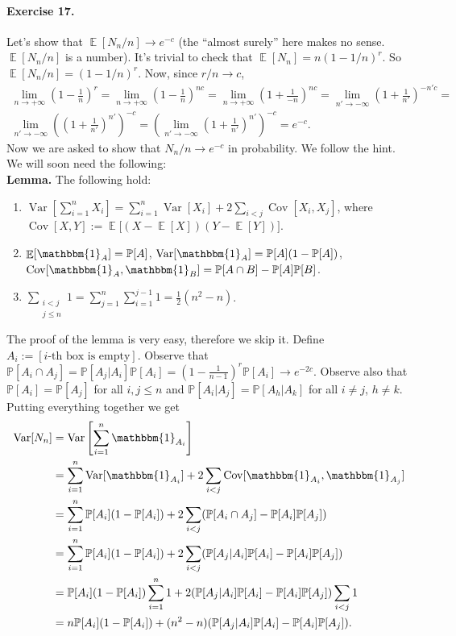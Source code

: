\documentclass[12pt,a4paper]{report}
\theoremstyle{definition}
\theoremstyle{num.custom-title}
\DeclareMathOperator{\E}{\mathbb{E}}
\DeclareMathOperator{\Var}{Var}
\DeclareMathOperator{\Cov}{Cov}
\renewcommand{\1}{\mathbbm{1}}
\renewcommand{\P}{\mathbb{P}}
\begin{document}
\paragraph{Exercise 17.} Let's show that $\E[N_n/n] \to e^{-c}$ (the ``almost surely'' here makes no sense. $\E[N_n/n]$ is a number). It's trivial to check that $\E[N_n]=n(1-1/n)^r$. So $\E[N_n/n]=(1-1/n)^r$. Now, since $r/n \to c$,
\begin{multline*}
	\lim_{n \to +\infty} \left( 1-\frac{1}{n} \right)^r = \lim_{n \to +\infty} \left( 1-\frac{1}{n} \right)^{nc} = \lim_{n \to +\infty} \left( 1+\frac{1}{-n} \right)^{nc} = \lim_{n' \to -\infty} \left( 1+\frac{1}{n'} \right)^{-n' c} = \\
	\lim_{n' \to -\infty} \left( \left( 1+\frac{1}{n'} \right)^{n'} \right) ^{-c} = \left( \lim_{n' \to -\infty}  \left( 1+\frac{1}{n'} \right)^{n'} \right) ^{-c} = e^{-c}.
\end{multline*}
Now we are asked to show that $N_n/n \to e^{-c}$ in probability. We follow the hint. We will soon need the following:\\
\textbf{Lemma.} The following hold:
\begin{enumerate}
	\item $\Var \left[ \sum_{i=1}^n X_i \right] = \sum_{i=1}^n \Var[X_i] + 2\sum_{i<j} \Cov[X_i,X_j]$, where \\
	$\Cov[X,Y] := \E{\big[(X - \E[X])(Y - \E[Y])\big]}$.
	\item $\E[\1_A] = \P[A]$, $\Var[\1_A] = \P[A](1-\P[A])$, $\Cov[\1_A,\1_B]= \P[A \cap B] - \P[A]\P[B]$.
	\item $\displaystyle \sum_{\substack{i<j \\ j \leq n}} 1 = \sum_{j=1}^n \sum_{i=1}^{j-1} 1 = \frac{1}{2} (n^2-n)$.
\end{enumerate}
The proof of the lemma is very easy, therefore we skip it. Define $A_i := [i\text{-th box is empty}]$. Observe that $\P[A_i \cap A_j] = \P[A_j | A_i] \P[A_i] = \left( 1 - \frac{1}{n-1} \right)^r \P[A_i] \to e^{-2c}$. Observe also that $\P[A_i]=\P[A_j]$ for all $i,j \leq n$ and $\P[A_i | A_j] = \P[A_h | A_k]$ for all $i \neq j$, $h \neq k$. Putting everything together we get
\begin{align*}
	\Var[N_n]
	&= \Var \left[ \sum_{i=1}^n \1_{A_i} \right] \\
	&= \sum_{i=1}^n \Var[\1_{A_i}] + 2\sum_{i<j} \Cov[\1_{A_i},\1_{A_j}] \\
	&= \sum_{i=1}^n \P[A_i](1-\P[A_i]) + 2\sum_{i<j} ( \P[A_i \cap A_j] - \P[A_i]\P[A_j] ) \\
	&= \sum_{i=1}^n \P[A_i](1-\P[A_i]) + 2\sum_{i<j} ( \P[A_j | A_i] \P[A_i] - \P[A_i]\P[A_j] ) \\
	&= \P[A_i](1-\P[A_i]) \sum_{i=1}^n 1 + 2 (\P[A_j | A_i] \P[A_i] - \P[A_i]\P[A_j]) \sum_{i<j} 1 \\
	&= n \P[A_i](1-\P[A_i]) +  (n^2-n) (\P[A_j | A_i] \P[A_i] - \P[A_i]\P[A_j]).
\end{align*}
\end{document}
